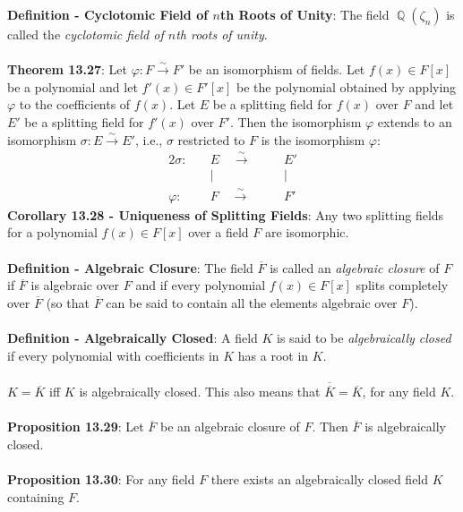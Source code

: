 \documentclass{article}
\DeclareMathOperator{\Q}{\mathbb{Q}}
\begin{document}
\textbf{Definition - Cyclotomic Field of $n$th Roots of Unity}: The field $\Q(\zeta_n)$ is called the \textit{cyclotomic field of $n$th roots of unity}. \\ \\
\textbf{Theorem 13.27}: Let $\varphi: F \xrightarrow{\sim} F'$ be an isomorphism of fields. Let $f(x) \in F[x]$ be a polynomial and let $f'(x) \in F'[x]$ be the polynomial obtained by applying $\varphi$ to the coefficients of $f(x)$. Let $E$ be a splitting field for $f(x)$ over $F$ and let $E'$ be a splitting field for $f'(x)$ over $F'$. Then the isomorphism $\varphi$ extends to an isomorphism $\sigma: E \xrightarrow{\sim} E'$, i.e., $\sigma$ restricted to $F$ is the isomorphism $\varphi:$ \begin{alignat*}{2}
    \sigma : \quad &E \quad \xrightarrow{\sim} \quad &&E' \\
    &| &&| \\
    \varphi : \quad &F \quad \xrightarrow{\sim} &&F'
\end{alignat*} $ $ \\
\textbf{Corollary 13.28 - Uniqueness of Splitting Fields}: Any two splitting fields for a polynomial $f(x) \in F[x]$ over a field $F$ are isomorphic. \\ \\
\textbf{Definition - Algebraic Closure}: The field $\overline{F}$ is called an \textit{algebraic closure} of $F$ if $\overline{F}$ is algebraic over $F$ and if every polynomial $f(x) \in F[x]$ splits completely over $\overline{F}$ (so that $\overline{F}$ can be said to contain all the elements algebraic over $F$). \\ \\
\textbf{Definition - Algebraically Closed}: A field $K$ is said to be \textit{algebraically closed} if every polynomial with coefficients in $K$ has a root in $K$. \\ \\
$K = \overline{K}$ iff $K$ is algebraically closed. This also means that $\overline{\overline{K}} = \overline{K}$, for any field $K$. \\ \\
\textbf{Proposition 13.29}: Let $\overline{F}$ be an algebraic closure of $F$. Then $\overline{F}$ is algebraically closed. \\ \\
\textbf{Proposition 13.30}: For any field $F$ there exists an algebraically closed field $K$ containing $F$. \\ \\
\end{document}
